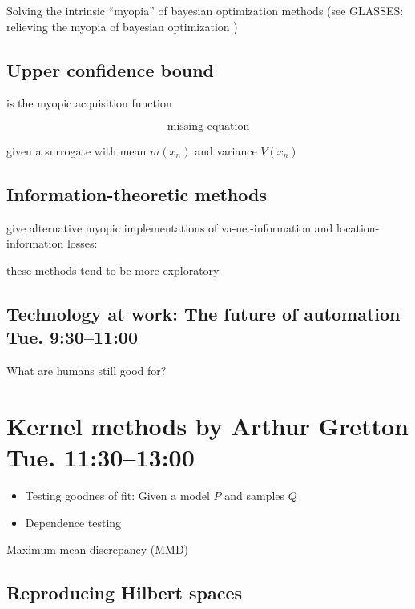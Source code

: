 \documentclass[b5paper]{report}
\begin{document}
Solving the intrinsic ``myopia'' of bayesian optimization methods (see GLASSES:
relieving the myopia of bayesian optimization \cite{gonzalez2016glasses})


\section{Upper confidence bound}

is the myopic acquisition function


\begin{equation}
  \text{missing equation}
\end{equation}

given a surrogate with mean $m(x_n)$ and variance $V(x_n)$


\section{Information-theoretic methods}

give alternative myopic implementations of va-ue.-information and
location-information losses:


these methods tend to be more exploratory

\section{Technology at work: The future of automation Tue. 9:30--11:00}


What are humans still good for?


\chapter{Kernel methods by Arthur Gretton Tue. 11:30--13:00}

\begin{itemize}
  \item Testing goodnes of fit: Given a model $P$ and samples $Q$
  \item Dependence testing
\end{itemize}

Maximum mean discrepancy (MMD)

\section{Reproducing Hilbert spaces}
\end{document}
